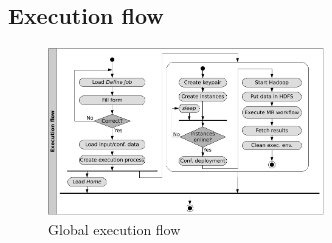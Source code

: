 \documentclass[conference]{IEEEtran}
\begin{document}
%  
%  
%  
% 
% 
%    
%  
% 




\subsection{Execution flow}\label{subsec:execution}

\begin{figure}[tp]
\centering
\includegraphics[width=0.65\textwidth]{img/006}
\caption{Global execution flow}
\label{fig:exflow}
\end{figure}
\end{document}
